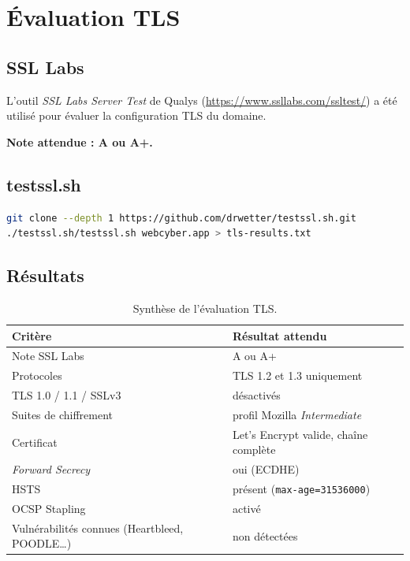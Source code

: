 \section{Évaluation TLS}

\subsection{SSL Labs}

L'outil \emph{SSL Labs Server Test} de Qualys
(\url{https://www.ssllabs.com/ssltest/}) a été utilisé pour évaluer la
configuration TLS du domaine.

\textbf{Note attendue : A ou A+.}

\subsection{testssl.sh}

\begin{lstlisting}[language=bash, caption={Évaluation locale avec testssl.sh.}]
git clone --depth 1 https://github.com/drwetter/testssl.sh.git
./testssl.sh/testssl.sh webcyber.app > tls-results.txt
\end{lstlisting}

\subsection{Résultats}

\begin{table}[H]
\centering
\caption{Synthèse de l'évaluation TLS.}
\begin{tabular}{P{6cm} P{8cm}}
\toprule
\textbf{Critère} & \textbf{Résultat attendu} \\
\midrule
Note SSL Labs                              & A ou A+ \\
Protocoles                                  & TLS 1.2 et 1.3 uniquement \\
TLS 1.0 / 1.1 / SSLv3                       & désactivés \\
Suites de chiffrement                        & profil Mozilla \emph{Intermediate} \\
Certificat                                   & Let's Encrypt valide, chaîne complète \\
\textit{Forward Secrecy}                     & oui (ECDHE) \\
HSTS                                         & présent (\texttt{max-age=31536000}) \\
OCSP Stapling                                & activé \\
Vulnérabilités connues (Heartbleed, POODLE\ldots) & non détectées \\
\bottomrule
\end{tabular}
\end{table}

